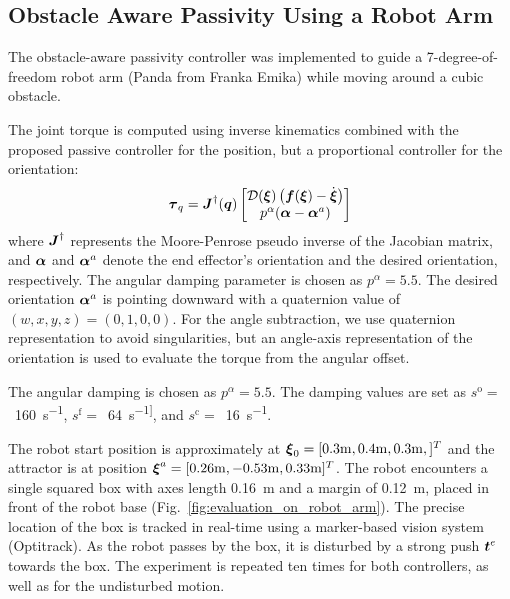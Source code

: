\subsection{Obstacle Aware Passivity Using a Robot Arm}
The obstacle-aware passivity controller was implemented to guide a 7-degree-of-freedom robot arm (Panda from Franka Emika) while moving around a cubic obstacle. 

The joint torque is computed using inverse kinematics combined with the proposed passive controller for the position, but a proportional controller for the orientation:
\begin{equation}
	\boldsymbol{\tau}_q = \boldsymbol{J}^{\dag}(\boldsymbol{q}) 
	\begin{bmatrix} \mathcal{D}(\boldsymbol{\xi}) \left( \boldsymbol{f}(\boldsymbol{\xi}) - \dot{\boldsymbol{\xi}} \right) \\  p^\alpha (\boldsymbol{\alpha} - \boldsymbol{\alpha}^a) \end{bmatrix}
\end{equation}
where $\boldsymbol{J}^{\dag}$ represents the Moore-Penrose pseudo inverse of the Jacobian matrix, and $\boldsymbol{\alpha}$ and $\boldsymbol{\alpha}^a$ denote the end effector's orientation and the desired orientation, respectively. The angular damping parameter is chosen as $p^\alpha = 5.5$.
The desired orientation $\boldsymbol{\alpha}^a$ is pointing downward with a quaternion value of $(w, x, y, z) = (0, 1, 0, 0)$. For the angle subtraction, we use quaternion representation to avoid singularities, but an angle-axis representation of the orientation is used to evaluate the torque from the angular offset.

The angular damping is chosen as $p^\alpha = 5.5$.
The damping values are set as
$s^{\mathrm{o}}=$~\qty{160}{s^{-1}},
$s^{\mathrm{f}}=$~\qty{64}{s^{-1]}}, and
$s^{\mathrm{c}}=$~\qty{16}{s^{-1}}.

The robot start position is approximately at $\boldsymbol{\xi}_0 = [0.3\mathrm{m}, 0.4\mathrm{m}, 0.3\mathrm{m},]^T$ and the attractor is at position $\boldsymbol{\xi}^a = [0.26 \mathrm{m}, -0.53\mathrm{m}, 0.33\mathrm{m}]^T$.
The robot encounters a single squared box with axes length \qty{0.16}{m} and a margin of \qty{0.12}{m}, placed in front of the robot base (Fig.~\ref{fig:evaluation_on_robot_arm}). The precise location of the box is tracked in real-time using a marker-based vision system (Optitrack). As the robot passes by the box, it is disturbed by a strong push $\boldsymbol{t}^e$ towards the box. The experiment is repeated ten times for both controllers, as well as for the undisturbed motion.

